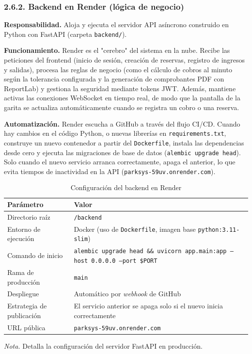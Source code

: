 \clearpage\subsubsection{2.6.2. Backend en Render (lógica de negocio)}

\textbf{Responsabilidad.} Aloja y ejecuta el servidor API asíncrono construido en Python con FastAPI (carpeta \texttt{backend/}).

\textbf{Funcionamiento.} Render es el "cerebro" del sistema en la nube. Recibe las peticiones del frontend (inicio de sesión, creación de reservas, registro de ingresos y salidas), procesa las reglas de negocio (como el cálculo de cobros al minuto según la tolerancia configurada y la generación de comprobantes PDF con ReportLab) y gestiona la seguridad mediante tokens JWT. Además, mantiene activas las conexiones WebSocket en tiempo real, de modo que la pantalla de la garita se actualiza automáticamente cuando se registra un cobro o una reserva.

\textbf{Automatización.} Render escucha a GitHub a través del flujo CI/CD. Cuando hay cambios en el código Python, o nuevas librerías en \texttt{requirements.txt}, construye un nuevo contenedor a partir del \texttt{Dockerfile}, instala las dependencias desde cero y ejecuta las migraciones de base de datos (\texttt{alembic upgrade head}). Solo cuando el nuevo servicio arranca correctamente, apaga el anterior, lo que evita tiempos de inactividad en la API (\texttt{parksys-59uv.onrender.com}).

\begin{table}[htbp]
\caption{Configuración del backend en Render}
\label{tab:config_render}
\begin{tabular}{@{}p{4cm} p{11cm}@{}}
\toprule
\textbf{Parámetro} & \textbf{Valor} \\
\midrule
Directorio raíz & \texttt{/backend} \\
Entorno de ejecución & Docker (uso de \texttt{Dockerfile}, imagen base \texttt{python:3.11-slim}) \\
Comando de inicio & \texttt{alembic upgrade head \&\& uvicorn app.main:app --host 0.0.0.0 --port \$PORT} \\
Rama de producción & \texttt{main} \\
Despliegue & Automático por \textit{webhook} de GitHub \\
Estrategia de publicación & El servicio anterior se apaga solo si el nuevo inicia correctamente \\
URL pública & \texttt{parksys-59uv.onrender.com} \\
\bottomrule
\end{tabular}
\par\vspace{0.2cm}
\textit{Nota.} Detalla la configuración del servidor FastAPI en producción.
\end{table}

